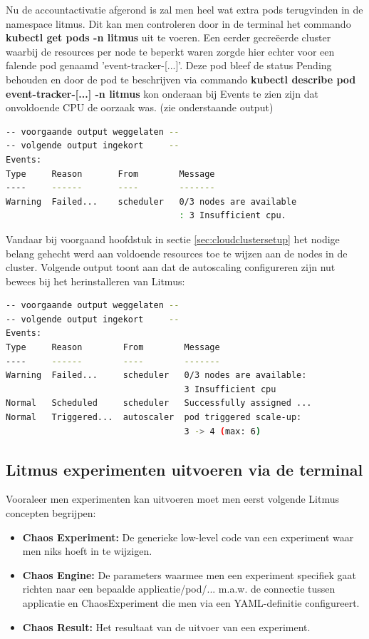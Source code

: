Nu de accountactivatie afgerond is zal men heel wat extra pods terugvinden in de namespace litmus. Dit kan men controleren door in de terminal het commando {\bf kubectl get pods -n litmus} uit te voeren. Een eerder gecreëerde cluster waarbij de resources per node te beperkt waren zorgde hier echter voor een falende pod genaamd 'event-tracker-[...]'. Deze pod bleef de status Pending behouden en door de pod te beschrijven via commando {\bf kubectl describe pod event-tracker-[...] -n litmus} kon onderaan bij Events te zien zijn dat onvoldoende CPU de oorzaak was. (zie onderstaande output)
 
\begin{lstlisting}[language=bash]
-- voorgaande output weggelaten --
-- volgende output ingekort     --
Events:
Type     Reason       From        Message
----     ------       ----        -------
Warning  Failed...    scheduler   0/3 nodes are available
                                  : 3 Insufficient cpu.
\end{lstlisting}
 
Vandaar bij voorgaand hoofdstuk in sectie \ref {sec:cloudclustersetup} het nodige belang gehecht werd aan voldoende resources toe te wijzen aan de nodes in de cluster. Volgende output toont aan dat de autoscaling configureren zijn nut bewees bij het herinstalleren van Litmus: 

\begin{lstlisting}[language=bash]
-- voorgaande output weggelaten --
-- volgende output ingekort     --
Events:
Type     Reason        From        Message
----     ------        ----        -------
Warning  Failed...     scheduler   0/3 nodes are available: 
                                   3 Insufficient cpu
Normal   Scheduled     scheduler   Successfully assigned ... 
Normal   Triggered...  autoscaler  pod triggered scale-up: 
                                   3 -> 4 (max: 6)
\end{lstlisting}

\subsection{Litmus experimenten uitvoeren via de terminal}

Vooraleer men experimenten kan uitvoeren moet men eerst volgende Litmus concepten begrijpen:
\begin{itemize}
    \item {\bf Chaos Experiment:} De generieke low-level code van een experiment waar men niks hoeft in te wijzigen.
    \item {\bf Chaos Engine:} De parameters waarmee men een experiment specifiek gaat richten naar een bepaalde applicatie/pod/... m.a.w. de connectie tussen applicatie en ChaosExperiment die men via een YAML-definitie configureert.
    \item {\bf Chaos Result:} Het resultaat van de uitvoer van een experiment. 
\end{itemize} 
 
